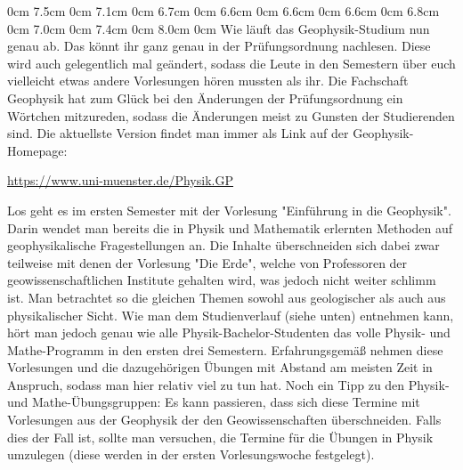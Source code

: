 \begin{multicols}{2}
0cm 7.5cm
0cm 7.1cm
0cm 6.7cm
0cm 6.6cm
0cm 6.6cm
0cm 6.6cm
0cm 6.8cm
0cm 7.0cm
0cm 7.4cm
0cm 8.0cm
0cm \columnwidth
Wie läuft das Geophysik-Studium nun genau ab.
Das könnt ihr ganz genau in der Prüfungsordnung nachlesen.
Diese wird auch gelegentlich mal geändert, sodass die Leute in den Semestern über euch vielleicht etwas andere Vorlesungen hören mussten als ihr.
Die Fachschaft Geophysik hat zum Glück bei den Änderungen der Prüfungsordnung ein Wörtchen mitzureden, sodass die Änderungen meist zu Gunsten der Studierenden sind.
Die aktuellste Version findet man immer als Link auf der Geophysik-Homepage:
\begin{center}
	\url{https://www.uni-muenster.de/Physik.GP}
\end{center}

Los geht es im ersten Semester mit der Vorlesung "Einführung in die Geophysik".
Darin wendet man bereits die in Physik und Mathematik erlernten Methoden auf geophysikalische Fragestellungen an.
Die Inhalte überschneiden sich dabei zwar teilweise mit denen der Vorlesung "Die Erde", welche von Professoren der geowissenschaftlichen Institute gehalten wird, was jedoch nicht weiter schlimm ist.
Man betrachtet so die gleichen Themen sowohl aus geologischer als auch aus physikalischer Sicht.
Wie man dem Studienverlauf (siehe unten) entnehmen kann, hört man jedoch genau wie alle Physik-Bachelor-Studenten das volle Physik- und Mathe-Programm in den ersten drei Semestern.
Erfahrungsgemäß nehmen diese Vorlesungen und die dazugehörigen Übungen mit Abstand am meisten Zeit in Anspruch, sodass man hier relativ viel zu tun hat.
Noch ein Tipp zu den Physik- und Mathe-Übungsgruppen: Es kann passieren, dass sich diese Termine mit Vorlesungen aus der Geophysik der den Geowissenschaften überschneiden.
Falls dies der Fall ist, sollte man versuchen, die Termine für die Übungen in Physik umzulegen (diese werden in der ersten Vorlesungswoche festgelegt).


\end{multicols}
